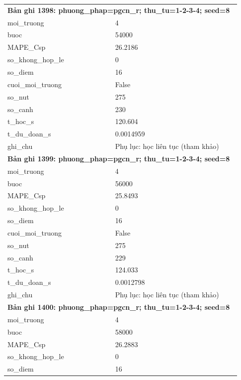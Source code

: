 \begin{longtable}{p{0.43\linewidth}p{0.50\linewidth}}
\midrule
\multicolumn{2}{p{0.95\linewidth}}{\textbf{Bản ghi 1398: phuong\_phap=pgcn\_r; thu\_tu=1-2-3-4; seed=8}} \\
moi\_\allowbreak truong & 4 \\
buoc & 54000 \\
MAPE\_\allowbreak Csp & 26.2186 \\
so\_\allowbreak khong\_\allowbreak hop\_\allowbreak le & 0 \\
so\_\allowbreak diem & 16 \\
cuoi\_\allowbreak moi\_\allowbreak truong & False \\
so\_\allowbreak nut & 275 \\
so\_\allowbreak canh & 230 \\
t\_\allowbreak hoc\_\allowbreak s & 120.604 \\
t\_\allowbreak du\_\allowbreak doan\_\allowbreak s & 0.0014959 \\
ghi\_\allowbreak chu & Phụ lục: học liên tục (tham khảo) \\
\midrule
\multicolumn{2}{p{0.95\linewidth}}{\textbf{Bản ghi 1399: phuong\_phap=pgcn\_r; thu\_tu=1-2-3-4; seed=8}} \\
moi\_\allowbreak truong & 4 \\
buoc & 56000 \\
MAPE\_\allowbreak Csp & 25.8493 \\
so\_\allowbreak khong\_\allowbreak hop\_\allowbreak le & 0 \\
so\_\allowbreak diem & 16 \\
cuoi\_\allowbreak moi\_\allowbreak truong & False \\
so\_\allowbreak nut & 275 \\
so\_\allowbreak canh & 229 \\
t\_\allowbreak hoc\_\allowbreak s & 124.033 \\
t\_\allowbreak du\_\allowbreak doan\_\allowbreak s & 0.0012798 \\
ghi\_\allowbreak chu & Phụ lục: học liên tục (tham khảo) \\
\midrule
\multicolumn{2}{p{0.95\linewidth}}{\textbf{Bản ghi 1400: phuong\_phap=pgcn\_r; thu\_tu=1-2-3-4; seed=8}} \\
moi\_\allowbreak truong & 4 \\
buoc & 58000 \\
MAPE\_\allowbreak Csp & 26.2883 \\
so\_\allowbreak khong\_\allowbreak hop\_\allowbreak le & 0 \\
so\_\allowbreak diem & 16 \\

\end{longtable}
